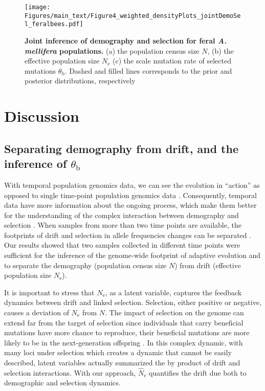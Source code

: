 \documentclass[a4paper, 12pt]{article}
\begin{document}
\begin{figure}[htb]
  \centering
  \texttt{[image: Figures/main\_text/Figure4\_weighted\_densityPlots\_jointDemoSel\_feralbees.pdf]}
  \small\caption{\textbf{Joint inference of demography and selection for feral \textit{A. mellifera} populations.} (a) the population census size $N$, (b) the effective population size $N_{\mathrm{e}}$ (c) the scale mutation rate of selected mutations $\theta_{\mathrm{b}}$. Dashed and filled lines corresponds to the prior and posterior distributions, respectively}
  \label{fig:postBees_jointdemosel}
\end{figure}

\section*{Discussion}

\subsection*{Separating demography from drift, and the inference of $\theta_{\mathrm{b}}$}

With temporal population genomics data, we can see the evolution in ``action'' as opposed to single time-point population genomics data \citep{Feder:2021bt}. Consequently, temporal data have more information about the ongoing process, which make them better for the understanding of the complex interaction between demography and selection \citep{Buffalo:2019ab, Dehasque:2020ku, Williams:2020gk}. When samples from more than two time points are available, the footprints of drift and selection in allele frequencies changes can be separated \citep[e.g.,][]{Buffalo:2020hq,Feder:2014fe}. Our results showed that two samples collected in different time points were sufficient for the inference of the genome-wide footprint of adaptive evolution and to separate the demography (population census size $N$) from drift (effective population size $N_{\mathrm{e}}$). 

It is important to stress that $N_{\mathrm{e}}$, as a latent variable, captures the feedback dynamics between drift and linked selection. Selection, either positive or negative, causes a deviation of $N_\mathrm{e}$ from $N$. The impact of selection on the genome can extend far from the target of selection since individuals that carry beneficial mutations have more chance to reproduce, their beneficial mutations are more likely to be in the next-generation offspring  \citep{Walsh:2018tv}. In this complex dynamic, with many loci under selection which creates a dynamic that cannot be easily described, latent variables actually summarized the by product of drift and selection interactions. With our approach, $\hat N_\mathrm{e}$ quantifies the drift due both to demographic and selection dynamics.
\end{document}
